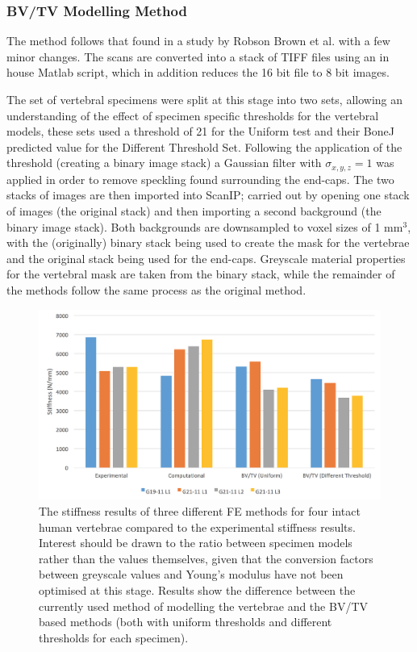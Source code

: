 \subsubsection{BV/TV Modelling Method}

The method follows that found in a study by Robson Brown et al.
\cite{RobsonBrown2014} with a few minor changes. The scans are converted into a
stack of TIFF files using an in house Matlab script, which in addition reduces
the 16 bit file to 8 bit images.

The set of vertebral specimens were split at this stage into two sets, allowing
an understanding of the effect of specimen specific thresholds for the vertebral
models, these sets used a threshold of 21 for the Uniform test and their BoneJ
predicted value for the Different Threshold Set. Following the application of
the threshold (creating a binary image stack) a Gaussian filter with $
\sigma_{x,y,z} = 1 $ was applied in order to remove speckling found surrounding
the end-caps. The two stacks of images are then imported into ScanIP; carried
out by opening one stack of images (the original stack) and then importing a
second background (the binary image stack). Both backgrounds are downsampled to
voxel sizes of 1 mm$^3$, with the (originally) binary stack being used to create
the mask for the vertebrae and the original stack being used for the end-caps.
Greyscale material properties for the vertebral mask are taken from the binary
stack, while the remainder of the methods follow the same process as the
original method.

\begin{figure}[ht]
  \centering
  \includegraphics[width=6in]{Chapters/Chapter_HT_images/diffModellingMethods.png}
  \caption{The stiffness results of three different FE methods for four intact
    human vertebrae compared to the experimental stiffness results. Interest
    should be drawn to the ratio between specimen models rather than the values
    themselves, given that the conversion factors between greyscale values and
    Young's modulus have not been optimised at this stage. Results show the
    difference between the currently used method of modelling the vertebrae and
    the BV/TV based methods (both with uniform thresholds and different
    thresholds for each specimen).}
  \label{fig:diffModellingMethods}
\end{figure}




